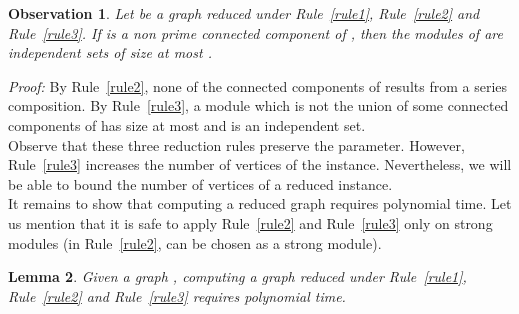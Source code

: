 \documentclass[11pt]{article}
\newenvironment{proof}{\noindent\textit{Proof: }}{{\hfill }}
\newtheorem{lemma}{Lemma}[section]
\newtheorem{observation}[lemma]{Observation}
\begin{document}
\begin{observation} \label{obs:reduced-123}
Let  be a graph reduced under Rule~\ref{rule1}, Rule~\ref{rule2} and Rule~\ref{rule3}. If  is a non prime connected component of , then the modules of  are independent sets of size at most .
\end{observation}

\begin{proof}
By Rule~\ref{rule2}, none of the connected components of  results from a series composition. By Rule~\ref{rule3}, a module which is not the union of some connected components of  has size at most  and is an independent set.
\end{proof}\\

Observe that these three reduction rules preserve the parameter. However, Rule~\ref{rule3} increases the number of vertices of the instance. Nevertheless, we will be able to bound the number of vertices of a reduced instance. \\

It remains to show that computing a reduced graph requires polynomial time. Let us mention that it is safe to apply Rule~\ref{rule2} and Rule~\ref{rule3} only on strong modules (in Rule~\ref{rule2},  can be chosen as a strong module).  

\begin{lemma} \label{lem:gen-reduced}
Given a graph , computing a graph reduced under Rule~\ref{rule1}, Rule~\ref{rule2} and Rule~\ref{rule3} requires polynomial time.
\end{lemma}
\end{document}
